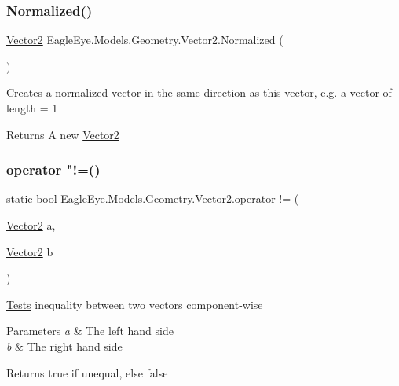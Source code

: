 \subsubsection{\texorpdfstring{Normalized()}{Normalized()}}
{\footnotesize\ttfamily \mbox{\hyperlink{struct_eagle_eye_1_1_models_1_1_geometry_1_1_vector2}{Vector2}} Eagle\+Eye.\+Models.\+Geometry.\+Vector2.\+Normalized (\begin{DoxyParamCaption}{ }\end{DoxyParamCaption})}



Creates a normalized vector in the same direction as this vector, e.\+g. a vector of length = 1 

\begin{DoxyReturn}{Returns}
A new \mbox{\hyperlink{struct_eagle_eye_1_1_models_1_1_geometry_1_1_vector2}{Vector2}}
\end{DoxyReturn}
\mbox{\label{struct_eagle_eye_1_1_models_1_1_geometry_1_1_vector2_acd00f015d699aa6b3c1799e6a8ebe561}} 
\subsubsection{\texorpdfstring{operator "!=()}{operator !=()}}
{\footnotesize\ttfamily static bool Eagle\+Eye.\+Models.\+Geometry.\+Vector2.\+operator != (\begin{DoxyParamCaption}\item[{\mbox{\hyperlink{struct_eagle_eye_1_1_models_1_1_geometry_1_1_vector2}{Vector2}}}]{a,  }\item[{\mbox{\hyperlink{struct_eagle_eye_1_1_models_1_1_geometry_1_1_vector2}{Vector2}}}]{b }\end{DoxyParamCaption})\hspace{0.3cm}{\ttfamily [static]}}



\mbox{\hyperlink{namespace_eagle_eye_1_1_tests}{Tests}} inequality between two vectors component-\/wise 


\begin{DoxyParams}{Parameters}
{\em a} & The left hand side\\
\hline
{\em b} & The right hand side\\
\hline
\end{DoxyParams}
\begin{DoxyReturn}{Returns}
true if unequal, else false
\end{DoxyReturn}
\mbox{\label{struct_eagle_eye_1_1_models_1_1_geometry_1_1_vector2_a22a207e259bc6984ae867a3911a93f46}} 

